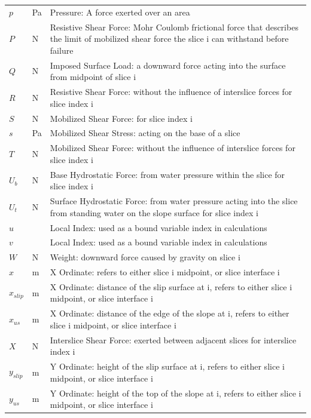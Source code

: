 \documentclass[12pt]{article}
\begin{document}
\begin{longtable}{  l  l  p{8.5cm}  }
$p$ & \si{\pascal} & Pressure: A force exerted over an area
\\
$P$ & \si{\newton} & Resistive Shear Force: Mohr Coulomb frictional force that describes the limit of mobilized shear force the slice i can withstand before failure
\\
$Q$ & \si{\newton} & Imposed Surface Load: a downward force acting into the surface from midpoint of slice i
\\
$R$ & \si{\newton} & Resistive Shear Force: without the influence of interslice forces for slice index i
\\
$S$ & \si{\newton} & Mobilized Shear Force: for slice index i
\\
$s$ &\si{\pascal} & Mobilized Shear Stress: acting on the base of a slice
\\
$T$ & \si{\newton} & Mobilized Shear Force: without the influence of interslice forces for slice index i
\\
${U_{b}}$ & \si{\newton} & Base Hydrostatic Force: from water pressure within the slice for slice index i
\\
${U_{t}}$ & \si{\newton} & Surface Hydrostatic Force: from water pressure acting into the slice from standing water on the slope surface for slice index i
\\
$u$ & & Local Index: used as a bound variable index in calculations
\\
$v$ &  &Local Index: used as a bound variable index in calculations
\\
$W$ & \si{\newton} &Weight: downward force caused by gravity on slice i
\\
$x$ & \si{\meter}& X Ordinate: refers to either slice i midpoint, or slice interface i
\\
${x_{slip}}$ &  \si{\meter}&X Ordinate: distance of the slip surface at i, refers to either slice i midpoint, or slice interface i
\\
${x_{us}}$ &  \si{\meter}&X Ordinate: distance of the edge of the slope at i, refers to either slice i midpoint, or slice interface i
\\
$X$ & \si{\newton} & Interslice Shear Force: exerted between adjacent slices for interslice index i
\\
${y_{slip}}$ & \si{\meter}& Y Ordinate: height of the slip surface at i, refers to either slice i midpoint, or slice interface i 
\\
${y_{us}}$ &  \si{\meter}&Y Ordinate: height of the top of the slope at i, refers to either slice i midpoint, or slice interface i 
\\

\end{longtable}
\end{document}
